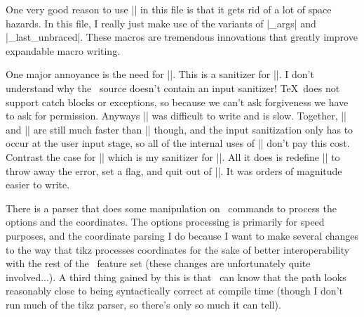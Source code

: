 One very good reason to use |\ExplSyntax| in this file is that it gets rid of a lot of space hazards. In this file, I really just make use of the variants of |\exp_args| and |\exp_last_unbraced|. These macros are tremendous innovations that greatly improve expandable macro writing.

One major annoyance is the need for |\sseq@ifintexpr|. This is a sanitizer for |\numexpr|. I don't understand why the \eTeX\ source doesn't contain an input sanitizer! \TeX\ does not support catch blocks or exceptions, so because we can't ask forgiveness we have to ask for permission. Anyways |\sseq@ifintexpr| was difficult to write and is slow. Together, |\sseq@ifintexpr| and |\numexpr| are still much faster than |\pgfmathparse| though, and the input sanitization only has to occur at the user input stage, so all of the internal uses of |\numexpr| don't pay this cost. Contrast the case for |\sseq@ifpgfmathexpr| which is my sanitizer for |\pgfmathparse|. All it does is redefine |\pgfmath@error| to throw away the error, set a flag, and quit out of |\pgfmathparse|. It was orders of magnitude easier to write.

There is a parser that does some manipulation on \tikzname\ commands to process the options and the coordinates. The options processing is primarily for speed purposes, and the coordinate parsing I do because I want to make several changes to the way that tikz processes coordinates for the sake of better interoperability with the rest of the \spectralsequences\ feature set (these changes are unfortunately quite involved...). A third thing gained by this is that \sseqpages\ can know that the path looks reasonably close to being syntactically correct at compile time (though I don't run much of the tikz parser, so there's only so much it can tell).


